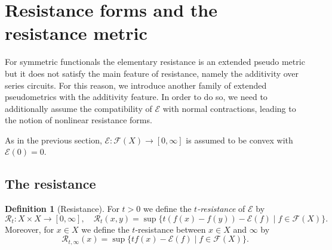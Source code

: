 \documentclass[a4paper,11pt,reqno]{amsart}
\theoremstyle{definition}
\newtheorem{definition}[lemma]{Definition}
\numberwithin{equation}{section}
\newcommand{\cR}{{\mathcal R}}
\newcommand{\cE}{{\mathcal E}}
\newcommand{\cF}{{\mathcal F}}
\newcommand{\N}{{\mathbb N}}
\newcommand{\av}[1]{\left\Vert #1\right\Vert}
\newcommand{\1}{\mathds{1}}
\begin{document}
%  
%  
%  
%  
%  
%  
%  
%  
%  
% 



\section{Resistance forms and the resistance metric} \label{section:nonlinear resistance forms}

For symmetric functionals the elementary resistance is an extended pseudo metric but it does not satisfy the main feature of resistance, namely the additivity over series circuits. For this reason, we introduce another family of extended pseudometrics with the additivity feature. In order to  do so, we need to additionally assume the compatibility of $\cE$ with normal contractions,  leading to the notion of nonlinear resistance forms.  

As in the previous section, $\cE \colon \cF(X) \to [0,\infty]$ is assumed to be convex with $\cE(0) = 0$. 



\subsection{The resistance} \label{subsection:resistance}

\begin{definition}[Resistance] \label{definition:resistance}
For $t > 0$ we define the {\em $t$-resistance} of $\cE$ by
%
$$\cR_t \colon X \times X \to [0,\infty],\quad \cR_t(x,y) = \sup \{ t(f(x) - f(y)) - \cE(f) \mid f \in \cF(X)\}.$$
%
Moreover, for $x \in X$ we define the $t$-resistance between $x \in X$ and $\infty$ by 
%
$$\cR_{t,\infty}(x) = \sup \{ t f(x) - \cE(f) \mid f \in \cF(X)\}.$$
%
\end{definition}
\end{document}
